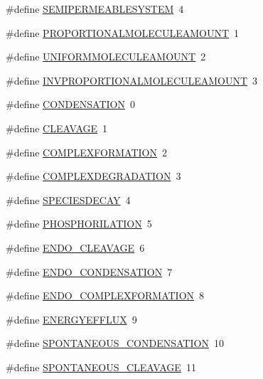 \begin{DoxyCompactItemize}
\item 
\#define \hyperlink{a00066_ae17f9f8f4dd0ff848e0863d37fae9d21}{S\-E\-M\-I\-P\-E\-R\-M\-E\-A\-B\-L\-E\-S\-Y\-S\-T\-E\-M}~4
\item 
\#define \hyperlink{a00066_a79c4b6317fd327fd5a62d65036481a25}{P\-R\-O\-P\-O\-R\-T\-I\-O\-N\-A\-L\-M\-O\-L\-E\-C\-U\-L\-E\-A\-M\-O\-U\-N\-T}~1
\item 
\#define \hyperlink{a00066_a6236cb136896f6bcbc6694d394e8aca3}{U\-N\-I\-F\-O\-R\-M\-M\-O\-L\-E\-C\-U\-L\-E\-A\-M\-O\-U\-N\-T}~2
\item 
\#define \hyperlink{a00066_ae36555e0be87892071c6340cc0fa43ad}{I\-N\-V\-P\-R\-O\-P\-O\-R\-T\-I\-O\-N\-A\-L\-M\-O\-L\-E\-C\-U\-L\-E\-A\-M\-O\-U\-N\-T}~3
\item 
\#define \hyperlink{a00066_aeeaf3e004dff03f70f94e0cf7d623b3c}{C\-O\-N\-D\-E\-N\-S\-A\-T\-I\-O\-N}~0
\item 
\#define \hyperlink{a00066_af490eeb67f57decd4fc403c50ec1afa0}{C\-L\-E\-A\-V\-A\-G\-E}~1
\item 
\#define \hyperlink{a00066_a44658f1c8c0e272eb0404d42e537928e}{C\-O\-M\-P\-L\-E\-X\-F\-O\-R\-M\-A\-T\-I\-O\-N}~2
\item 
\#define \hyperlink{a00066_ab9c64bfc35cc5e2e712759d474091c4d}{C\-O\-M\-P\-L\-E\-X\-D\-E\-G\-R\-A\-D\-A\-T\-I\-O\-N}~3
\item 
\#define \hyperlink{a00066_ac25e9340e22e7e130dccfb4773224d21}{S\-P\-E\-C\-I\-E\-S\-D\-E\-C\-A\-Y}~4
\item 
\#define \hyperlink{a00066_ac5482213f767aca98865e7ea785882d4}{P\-H\-O\-S\-P\-H\-O\-R\-I\-L\-A\-T\-I\-O\-N}~5
\item 
\#define \hyperlink{a00066_a96f1798e4da28ce26b866585be4e363d}{E\-N\-D\-O\-\_\-\-C\-L\-E\-A\-V\-A\-G\-E}~6
\item 
\#define \hyperlink{a00066_a840f787adb443d5d9492b18d3180c233}{E\-N\-D\-O\-\_\-\-C\-O\-N\-D\-E\-N\-S\-A\-T\-I\-O\-N}~7
\item 
\#define \hyperlink{a00066_a1f0638306dc456453be7d6be35c3f617}{E\-N\-D\-O\-\_\-\-C\-O\-M\-P\-L\-E\-X\-F\-O\-R\-M\-A\-T\-I\-O\-N}~8
\item 
\#define \hyperlink{a00066_a66f3205fa4a725d70d3ea246fed2336a}{E\-N\-E\-R\-G\-Y\-E\-F\-F\-L\-U\-X}~9
\item 
\#define \hyperlink{a00066_a9248f5baf3277731d21513c01ab14ba2}{S\-P\-O\-N\-T\-A\-N\-E\-O\-U\-S\-\_\-\-C\-O\-N\-D\-E\-N\-S\-A\-T\-I\-O\-N}~10
\item 
\#define \hyperlink{a00066_adb07a512ddff058539c565dc597f8925}{S\-P\-O\-N\-T\-A\-N\-E\-O\-U\-S\-\_\-\-C\-L\-E\-A\-V\-A\-G\-E}~11

\end{DoxyCompactItemize}
